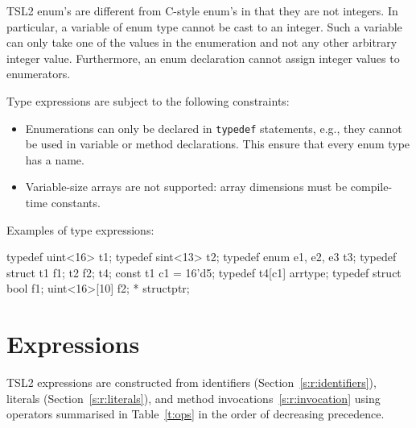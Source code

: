 \documentclass{report}
\newcommand{\src}[1]{\texttt{#1}}
\newcommand{\tsl}{TSL2 }
\begin{document}
\tsl enum's are different from C-style enum's in that they are not 
integers.  In particular, a variable of enum type cannot be cast 
to an integer.  Such a variable can only take one of the values in 
the enumeration and not any other arbitrary integer value.  
Furthermore, an enum declaration cannot assign integer values to 
enumerators.

Type expressions are subject to the following constraints:
\begin{itemize}
    \item Enumerations can only be declared in \src{typedef}
        statements, e.g., they cannot be used in variable or 
        method declarations.  This ensure that every enum type has 
        a name.
    \item Variable-size arrays are not supported: array dimensions 
        must be compile-time constants.
\end{itemize}

Examples of type expressions:

\begin{tsllisting}{}
typedef uint<16> t1;
typedef sint<13> t2;
typedef enum {e1, e2, e3} t3;
typedef struct {t1 f1; t2 f2;} t4;
const t1 c1 = 16'd5;
typedef t4[c1] arrtype;
typedef struct {bool f1; uint<16>[10] f2;} * structptr;
\end{tsllisting}

\section{Expressions}

\tsl expressions are constructed from identifiers 
(Section~\ref{s:r:identifiers}), literals
(Section~\ref{s:r:literals}), and method 
invocations~\ref{s:r:invocation} using operators summarised in 
Table~\ref{t:ops} in the order of decreasing precedence.
\end{document}
